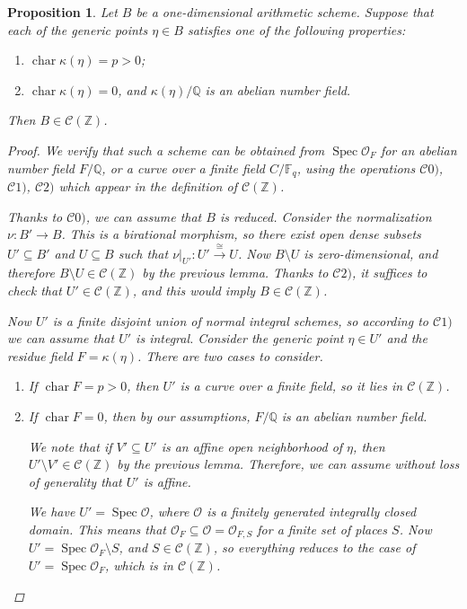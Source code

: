 \documentclass[10pt,a4paper,oneside]{article}
\DeclareMathOperator{\fchar}{char}
\DeclareMathOperator{\Spec}{Spec}
\newcommand{\FF}{\mathbb{F}}
\newcommand{\QQ}{\mathbb{Q}}
\newcommand{\ZZ}{\mathbb{Z}}
\theoremstyle{myplain}
\newtheorem{proposition}[theorem]{Proposition}
\theoremstyle{mydefinition}
\numberwithin{equation}{section}
\begin{document}
\begin{proposition}
  \label{prop:particular-cases-1-dim-base}
  Let $B$ be a one-dimensional arithmetic scheme. Suppose that each of the
  generic points $\eta \in B$ satisfies one of the following properties:
  \begin{enumerate}
  \item[a)] $\fchar \kappa (\eta) = p > 0$;

  \item[b)] $\fchar \kappa (\eta) = 0$, and $\kappa (\eta)/\QQ$ is an abelian
    number field.
  \end{enumerate}
  Then $B \in \mathcal{C} (\ZZ)$.

  \begin{proof}
    We verify that such a scheme can be obtained from $\Spec \mathcal{O}_F$ for
    an abelian number field $F/\QQ$, or a curve over a finite field $C/\FF_q$,
    using the operations $\mathcal{C}0)$, $\mathcal{C}1)$, $\mathcal{C}2)$ which
    appear in the definition of $\mathcal{C} (\ZZ)$.

    Thanks to $\mathcal{C}0)$, we can assume that $B$ is reduced. Consider the
    normalization $\nu\colon B' \to B$. This is a birational morphism, so there
    exist open dense subsets $U' \subseteq B'$ and $U \subseteq B$ such that
    $\left.\nu\right|_{U'}\colon U' \xrightarrow{\cong} U$. Now $B\setminus U$
    is zero-dimensional, and therefore $B\setminus U \in \mathcal{C} (\ZZ)$ by
    the previous lemma. Thanks to $\mathcal{C}2)$, it suffices to check that
    $U' \in \mathcal{C} (\ZZ)$, and this would imply $B \in \mathcal{C} (\ZZ)$.

    Now $U'$ is a finite disjoint union of normal integral schemes, so according
    to $\mathcal{C}1)$ we can assume that $U'$ is integral. Consider the generic
    point $\eta \in U'$ and the residue field $F = \kappa (\eta)$. There are two
    cases to consider.

    \begin{enumerate}
    \item[a)] If $\fchar F = p > 0$, then $U'$ is a curve over a finite field,
      so it lies in $\mathcal{C} (\ZZ)$.

    \item[b)] If $\fchar F = 0$, then by our assumptions, $F/\QQ$ is an abelian
      number field.

      We note that if $V' \subseteq U'$ is an affine open neighborhood of
      $\eta$, then $U'\setminus V' \in \mathcal{C} (\ZZ)$ by the previous
      lemma. Therefore, we can assume without loss of generality that $U'$ is
      affine.

      We have $U' = \Spec \mathcal{O}$, where $\mathcal{O}$ is a finitely
      generated integrally closed domain. This means that
      $\mathcal{O}_F \subseteq \mathcal{O} = \mathcal{O}_{F,S}$ for a finite set
      of places $S$. Now $U' = \Spec \mathcal{O}_F \setminus S$, and
      $S \in \mathcal{C} (\ZZ)$, so everything reduces to the case of
      $U' = \Spec \mathcal{O}_F$, which is in $\mathcal{C} (\ZZ)$. \qedhere
    \end{enumerate}
  \end{proof}
\end{proposition}
\end{document}

